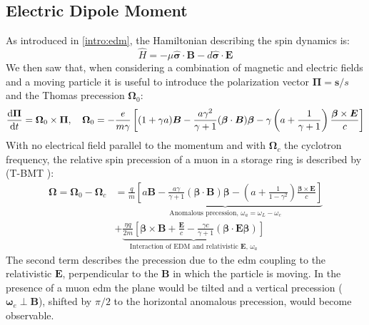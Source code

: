 \begin{refsection}
\section{Electric Dipole Moment}
    As introduced in \ref{intro:edm}, the Hamiltonian describing the spin dynamics is:
    \begin{equation*}
        \hat{H} = -\mu\bm{\hat{\sigma}\cdot B}-d\bm{\hat{\sigma}\cdot E}
    \end{equation*}
    We then saw that, when considering a combination of magnetic and electric fields and a moving particle it is useful to introduce the polarization vector $\bm{\Pi}=\bm{s}/s$ and the Thomas precession $\bm{\Omega}_0$:
    \begin{equation*}
        \dv{\bm{\Pi}}{t}=\bm{\Omega}_0 \times \bm{\Pi}, \quad
        \bm{\Omega}_0 = -\frac{e}{m\gamma} \left[ (1+\gamma a)\bm{B}-\frac{a\gamma^2}{\gamma+1}(\bm{\beta}\cdot\bm{B})\bm{\beta}-\gamma \left( a+\frac{1}{\gamma+1} \right) \frac{\bm{\beta}\times \bm{E}}{c} \right]
    \end{equation*}
    With no electrical field parallel to the momentum and with $\bm{\Omega}_c$ the cyclotron frequency, the relative spin precession of a muon in a storage ring is described by (T-BMT \cite{miss-59}):
    \begin{equation}
        \begin{split}
            \bm{\Omega}=\bm{\Omega}_0-\bm{\Omega}_c &=
            \underbrace{ 
                \frac{q}{m}\left[ a\bm{B} -{\frac{a\gamma}{\gamma+1}(\bm{\beta}\cdot \bm{B})\bm{\beta}} - \left(  a+\frac{1}{1-\gamma^2}\right)\frac{\bm{\beta} \times \bm{E}}{c} \right]
            }_{\text{Anomalous precession, } \omega_a=\omega_L-\omega_c} \\&+
            \underbrace{
                \frac{\eta q}{2m}\left[ \bm{\beta} \times \bm{B} + \frac{\bm{E}}{c}- {\frac{\gamma c}{\gamma+1}(\bm{\beta}\cdot\bm{E\beta})} \right]
            }_{\text{Interaction of EDM and relativistic $\bm{E}$, } \omega_a}
        \end{split}
        \label{eq:muedm:precession}
    \end{equation}
    The second term describes the precession due to the \gls{edm} coupling to the relativistic $\bm{E}$, perpendicular to the $\bm{B}$ in which the particle is moving. 
    In the presence of a muon \gls{edm} the plane would be tilted and a vertical precession ($\bm{\omega}_e\perp\bm{B}$), shifted by $\pi/2$ to the horizontal anomalous precession, would become observable.


\end{refsection}
